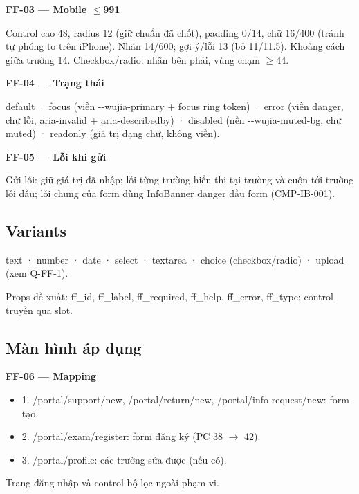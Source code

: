 \documentclass[11pt,a4paper]{report}
\begin{document}
\par\smallskip\textbf{FF-03 — Mobile \(\leq\)991}\par
Control cao 48, radius 12 (giữ chuẩn đã chốt), padding 0/\allowbreak{}14, chữ 16/\allowbreak{}400 (tránh tự phóng to trên iPhone). Nhãn 14/\allowbreak{}600; gợi ý/\allowbreak{}lỗi 13 (bỏ 11/\allowbreak{}11.5). Khoảng cách giữa trường 14. Checkbox/\allowbreak{}radio: nhãn bên phải, vùng chạm \(\geq\)44.\par

\par\smallskip\textbf{FF-04 — Trạng thái}\par
default · focus (viền -\kern0pt-\allowbreak{}wujia-\allowbreak{}primary + focus ring token) · error (viền danger, chữ lỗi, aria-\allowbreak{}invalid + aria-\allowbreak{}describedby) · disabled (nền -\kern0pt-\allowbreak{}wujia-\allowbreak{}muted-\allowbreak{}bg, chữ muted) · readonly (giá trị dạng chữ, không viền).\par

\par\smallskip\textbf{FF-05 — Lỗi khi gửi}\par
Gửi lỗi: giữ giá trị đã nhập; lỗi từng trường hiển thị tại trường và cuộn tới trường lỗi đầu; lỗi chung của form dùng InfoBanner danger đầu form (CMP-IB-001).\par
\subsection*{Variants}
text · number · date · select · textarea · choice (checkbox/\allowbreak{}radio) · upload (xem Q-FF-1).\par
Props đề xuất: ff\_id, ff\_label, ff\_required, ff\_help, ff\_error, ff\_type; control truyền qua slot.\par
\subsection*{Màn hình áp dụng}
\par\smallskip\textbf{FF-06 — Mapping}\par
\begin{itemize}[label={}]
\item 1. /portal/\allowbreak{}support/\allowbreak{}new, /portal/\allowbreak{}return/\allowbreak{}new, /portal/\allowbreak{}info-\allowbreak{}request/\allowbreak{}new: form tạo.
\item 2. /portal/\allowbreak{}exam/\allowbreak{}register: form đăng ký (PC 38 \(\to\) 42).
\item 3. /portal/\allowbreak{}profile: các trường sửa được (nếu có).
\end{itemize}
Trang đăng nhập và control bộ lọc ngoài phạm vi.\par
\end{document}
